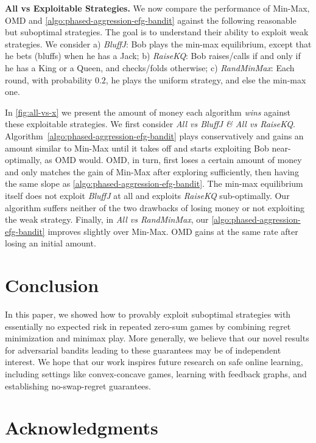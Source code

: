 \documentclass[11pt]{article}
\begin{document}
\textbf{All vs Exploitable Strategies.} We now compare the performance of Min-Max, OMD and \cref{algo:phased-aggression-efg-bandit} against the following reasonable but suboptimal strategies. The goal is to understand their ability to exploit weak strategies. We consider a) \emph{BluffJ}: Bob plays the min-max equilibrium, except that he bets (bluffs) when he has a Jack; b) \emph{RaiseKQ}: Bob raises/calls if and only if he has a King or a Queen, and checks/folds otherwise; c) \emph{RandMinMax}: Each round, with probability $0.2$, he plays the uniform strategy, and else the min-max one.

In \cref{fig:all-vs-x} we present the amount of money each algorithm \emph{wins} against these exploitable strategies. We first consider \emph{All vs BluffJ \& All vs RaiseKQ}. Algorithm~\ref{algo:phased-aggression-efg-bandit} plays conservatively and gains an amount similar to Min-Max until it takes off and starts exploiting Bob near-optimally, as OMD would. OMD, in turn, first loses a certain amount of money and only matches the gain of Min-Max after exploring sufficiently, then having the same slope as \cref{algo:phased-aggression-efg-bandit}. The min-max equilibrium itself does not exploit \textit{BluffJ} at all and exploits \textit{RaiseKQ} sub-optimally. Our algorithm suffers neither of the two drawbacks of losing money or not exploiting the weak strategy. Finally, in \emph{All vs RandMinMax}, our \cref{algo:phased-aggression-efg-bandit} improves slightly over Min-Max. OMD gains at the same rate after losing an initial amount. 


\section{Conclusion}

In this paper, we showed how to provably exploit suboptimal strategies with essentially no expected risk in repeated zero-sum games by combining regret minimization and minimax play. More generally, we believe that our novel results for adversarial bandits leading to these guarantees may be of independent interest. We hope that our work inspires future research on safe online learning, including settings like convex-concave games, learning with feedback graphs, and establishing no-swap-regret guarantees.

\section*{Acknowledgments}
\end{document}

